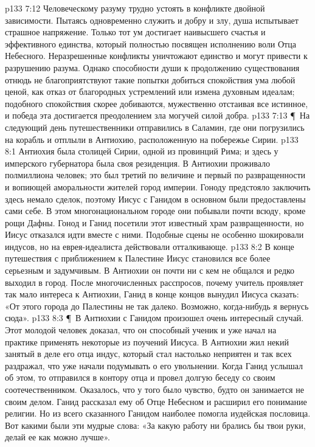 \vs p133 7:12 Человеческому разуму трудно устоять в конфликте двойной зависимости. Пытаясь одновременно служить и добру и злу, душа испытывает страшное напряжение. Только тот ум достигает наивысшего счастья и эффективного единства, который полностью посвящен исполнению воли Отца Небесного. Неразрешенные конфликты уничтожают единство и могут привести к разрушению разума. Однако способности души к продолжению существования отнюдь не благоприятствуют такие попытки добиться спокойствия ума любой ценой, как отказ от благородных устремлений или измена духовным идеалам; подобного спокойствия скорее добиваются, мужественно отстаивая все истинное, и победа эта достигается преодолением зла могучей силой добра.
\vs p133 7:13 \P\ На следующий день путешественники отправились в Саламин, где они погрузились на корабль и отплыли в Антиохию, расположенную на побережье Сирии.
\vs p133 8:1 Антиохия была столицей Сирии, одной из провинций Рима; и здесь у имперского губернатора была своя резиденция. В Антиохии проживало полмиллиона человек; это был третий по величине и первый по развращенности и вопиющей аморальности жителей город империи. Гоноду предстояло заключить здесь немало сделок, поэтому Иисус с Ганидом в основном были предоставлены сами себе. В этом многонациональном городе они побывали почти всюду, кроме рощи Дафны. Гонод и Ганид посетили этот известный храм развращенности, но Иисус отказался идти вместе с ними. Подобные сцены не особенно шокировали индусов, но на еврея\hyp{}идеалиста действовали отталкивающе.
\vs p133 8:2 В конце путешествия с приближением к Палестине Иисус становился все более серьезным и задумчивым. В Антиохии он почти ни с кем не общался и редко выходил в город. После многочисленных расспросов, почему учитель проявляет так мало интереса к Антиохии, Ганид в конце концов вынудил Иисуса сказать: «От этого города до Палестины не так далеко. Возможно, когда\hyp{}нибудь я вернусь сюда».
\vs p133 8:3 \P\ В Антиохии с Ганидом произошел очень интересный случай. Этот молодой человек доказал, что он способный ученик и уже начал на практике применять некоторые из поучений Иисуса. В Антиохии жил некий занятый в деле его отца индус, который стал настолько неприятен и так всех раздражал, что уже начали подумывать о его увольнении. Когда Ганид услышал об этом, то отправился в контору отца и провел долгую беседу со своим соотечественником. Оказалось, что у того было чувство, будто он занимается не своим делом. Ганид рассказал ему об Отце Небесном и расширил его понимание религии. Но из всего сказанного Ганидом наиболее помогла иудейская пословица. Вот какими были эти мудрые слова: «За какую работу ни брались бы твои руки, делай ее как можно лучше».
